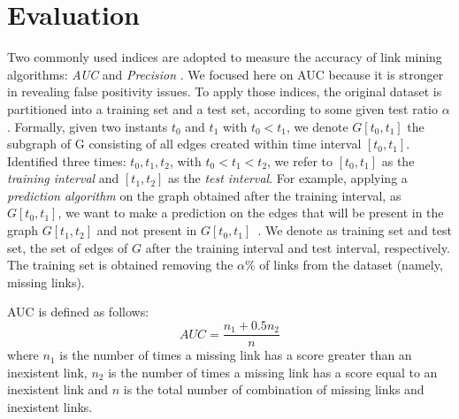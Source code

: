 \section{Evaluation}
\label{sec:evaluation}

Two commonly used indices are adopted to measure the accuracy of link mining algorithms: \textit{AUC} and  \textit{Precision} \cite{Lu2011}. We focused here on AUC because it is stronger in revealing false positivity issues.
%
To apply those indices, the original dataset is partitioned into a training set and a test set, according to some given test ratio $\alpha$. 
%
Formally, given two instants $t_{0}$ and $t_{1}$ with $t_{0} < t_{1}$, we denote $G[t_{0},t_{1}]$ the subgraph of G consisting of all edges created within time interval $[t_{0},t_{1}]$. Identified three times: $t_{0}, t_{1}, t_{2}$, with $t_{0}<t_{1}<t_{2}$, we refer to $[t_{0},t_{1}]$ as the \textit{training interval} and $[t_{1},t_{2}]$ as the \textit{test interval}. For example, applying a \textit{prediction algorithm} on the graph obtained after the training interval, as $G[t_{0},t_{1}]$, we want to make a prediction on the edges that will be present in the graph $G[t_{1},t_{2}]$ and not present in $G[t_{0},t_{1}]$~\cite{Liben-Nowell}.
%
We denote as training set and test set, the set of edges of $G$ after the training interval and test interval, respectively. The training set is obtained removing the $\alpha\%$ of links from the dataset (namely, missing links).

AUC is defined as follows:
%
\begin{equation}
\label{eqn:auc}
AUC=\frac{n_{1}+0.5n_{2}}{n}
\end{equation}
%
where 
$n_{1}$ is the number of times a missing link has a score greater than an inexistent link,
$n_{2}$ is the number of times a missing link has a score equal to an inexistent link and
$n$ is the total number of combination of missing links and inexistent links.

